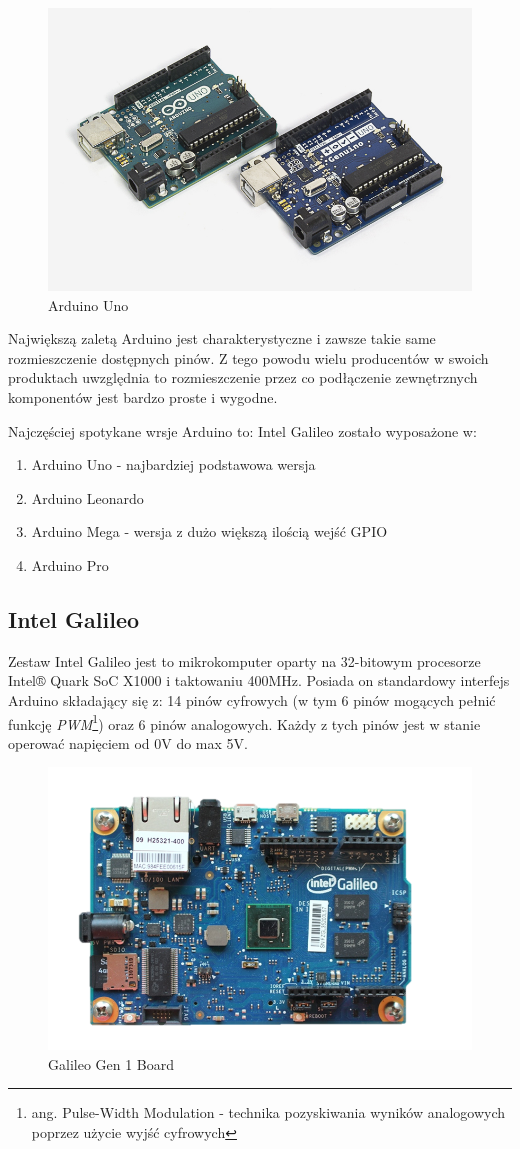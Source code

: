 \documentclass{xmgr}
\begin{document}
\begin{figure}[!h]
    \centering
    \includegraphics[height=0.4\textwidth]{images/uno.jpg}
    \caption{Arduino Uno \label{Arduino Uno}}
\end{figure}

Największą zaletą Arduino jest charakterystyczne i zawsze takie same rozmieszczenie dostępnych pinów. Z tego powodu wielu producentów w swoich produktach uwzględnia to rozmieszczenie przez co podłączenie zewnętrznych komponentów jest bardzo proste i wygodne.

Najczęściej spotykane wrsje Arduino to:
Intel Galileo zostało wyposażone w:
\begin{enumerate}
  \item Arduino Uno - najbardziej podstawowa wersja
  \item Arduino Leonardo
  \item Arduino Mega - wersja z dużo większą ilością wejść GPIO
  \item Arduino Pro
\end{enumerate}

\subsection{Intel Galileo}
Zestaw Intel Galileo jest  to mikrokomputer oparty na 32-bitowym procesorze Intel® Quark SoC X1000 i taktowaniu 400MHz. Posiada on standardowy interfejs Arduino składający się z: 14 pinów cyfrowych (w tym 6 pinów mogących pełnić funkcję \emph{PWM}\footnote{ang. Pulse-Width Modulation - technika pozyskiwania wyników analogowych poprzez użycie wyjść cyfrowych}) oraz 6 pinów analogowych. Każdy z tych pinów jest w stanie operować napięciem od 0V do max 5V.

\begin{figure}[!h]
    \centering
    \includegraphics[height=0.4\textwidth]{images/galileo.png}
    \caption{Galileo Gen 1 Board \label{Galileo Gen 1 Board}}
\end{figure}
\end{document}
